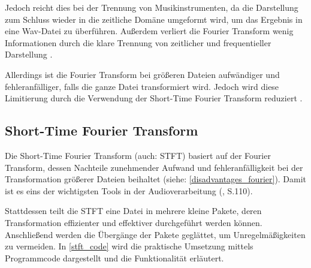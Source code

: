 \par

Jedoch reicht dies bei der Trennung von Musikinstrumenten, da die Darstellung zum Schluss wieder in die zeitliche Domäne umgeformt wird, um das Ergebnis in eine Wav-Datei zu überführen. Außerdem verliert die Fourier Transform wenig Informationen durch die klare Trennung von zeitlicher und frequentieller Darstellung \parencite{Parsons_2000}.

\par

Allerdings ist die Fourier Transform bei größeren Dateien aufwändiger und fehleranfälliger, falls die ganze Datei transformiert wird. Jedoch wird diese Limitierung durch die Verwendung der Short-Time Fourier Transform reduziert \parencite{Prashanth_2017}.

%
\subsection{Short-Time Fourier Transform}
%

Die Short-Time Fourier Transform (auch: STFT) basiert auf der Fourier Transform, dessen Nachteile zunehmender Aufwand und fehleranfälligkeit bei der Transformation größerer Dateien beihaltet (siehe: \cref{disadvantages_fourier}). Damit ist es eins der wichtigsten Tools in der Audioverarbeitung (\cite{fundamentals_of_music_processing}, S.110).

\par

Stattdessen teilt die STFT eine Datei in mehrere kleine Pakete, deren Transformation effizienter und effektiver durchgeführt werden können. Anschließend werden die Übergänge der Pakete geglättet, um Unregelmäßigkeiten zu vermeiden. In \cref{stft_code} wird die praktische Umsetzung mittels Programmcode dargestellt und die Funktionalität erläutert.